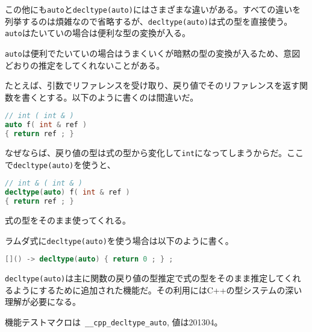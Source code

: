 この他にも\lstinline!auto!と\lstinline!decltype(auto)!にはさまざまな違いがある。すべての違いを列挙するのは煩雑なので省略するが、\lstinline!decltype(auto)!は式の型を直接使う。\lstinline!auto!はたいていの場合は便利な型の変換が入る。

\lstinline!auto!は便利でたいていの場合はうまくいくが暗黙の型の変換が入るため、意図どおりの推定をしてくれないことがある。

たとえば、引数でリファレンスを受け取り、戻り値でそのリファレンスを返す関数を書くとする。以下のように書くのは間違いだ。

\begin{lstlisting}[language=C++]
// int ( int & )
auto f( int & ref )
{ return ref ; }
\end{lstlisting}

なぜならば、戻り値の型は式の型から変化して\lstinline!int!になってしまうからだ。ここで\lstinline!decltype(auto)!を使うと、
\begin{lstlisting}[language=C++]
// int & ( int & )
decltype(auto) f( int & ref )
{ return ref ; }
\end{lstlisting}
式の型をそのまま使ってくれる。

ラムダ式に\lstinline!decltype(auto)!を使う場合は以下のように書く。

\begin{lstlisting}[language=C++]
[]() -> decltype(auto) { return 0 ; } ;
\end{lstlisting}

\lstinline!decltype(auto)!は主に関数の戻り値の型推定で式の型をそのまま推定してくれるようにするために追加された機能だ。その利用にはC++の型システムの深い理解が必要になる。

機能テストマクロは~\lstinline!__cpp_decltype_auto!, 値は201304。
